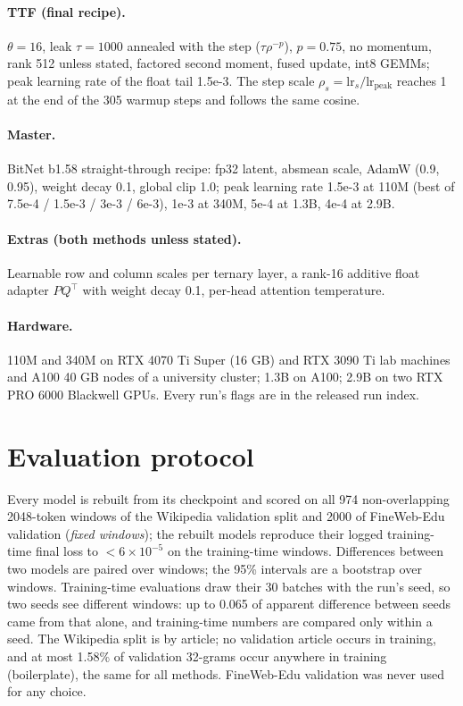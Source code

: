 \documentclass[10pt,twocolumn]{article}
\begin{document}
\paragraph{TTF (final recipe).} $\theta=16$, leak $\tau=1000$ annealed with the step ($\tau\rho^{-p}$), $p=0.75$, no
momentum, rank 512 unless stated, factored second moment, fused update, int8 GEMMs; peak learning rate of the float tail
1.5e-3. The step scale $\rho_s=\mathrm{lr}_s/\mathrm{lr}_{\text{peak}}$ reaches 1 at the end of the 305 warmup steps and
follows the same cosine.

\paragraph{Master.} BitNet b1.58 straight-through recipe: fp32 latent, absmean scale, AdamW (0.9, 0.95), weight decay
0.1, global clip 1.0; peak learning rate 1.5e-3 at 110M (best of 7.5e-4 / 1.5e-3 / 3e-3 / 6e-3), 1e-3 at 340M, 5e-4 at
1.3B, 4e-4 at 2.9B.

\paragraph{Extras (both methods unless stated).} Learnable row and column scales per ternary layer, a rank-16 additive
float adapter $PQ^\top$ with weight decay 0.1, per-head attention temperature.

\paragraph{Hardware.} 110M and 340M on RTX 4070 Ti Super (16 GB) and RTX 3090 Ti lab machines and A100 40 GB nodes
of a university cluster; 1.3B on A100; 2.9B on two RTX PRO 6000 Blackwell GPUs. Every run's flags are in the released
run index.

\section{Evaluation protocol}\label{app:eval}
Every model is rebuilt from its checkpoint and scored on all 974 non-overlapping 2048-token windows of the Wikipedia
validation split and 2000 of FineWeb-Edu validation (\emph{fixed windows}); the rebuilt models reproduce their logged
training-time final loss to $<6\times10^{-5}$ on the training-time windows. Differences between two models are paired
over windows; the 95\% intervals are a bootstrap over windows. Training-time evaluations draw their 30 batches with the
run's seed, so two seeds see different windows: up to 0.065 of apparent difference between seeds came from that alone,
and training-time numbers are compared only within a seed. The Wikipedia split is by article; no validation article
occurs in training, and at most 1.58\% of validation 32-grams occur anywhere in training (boilerplate), the same for all
methods. FineWeb-Edu validation was never used for any choice.
\end{document}
